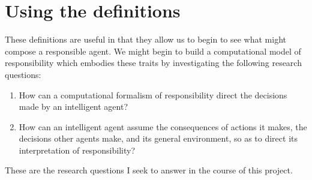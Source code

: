 \section{Using the definitions}
These definitions are useful in that they allow us to begin to see what might compose a responsible agent. We might begin to build a computational model of responsibility which embodies these traits by investigating the following research questions:
\begin{enumerate}
    \item How can a computational formalism of responsibility direct the decisions made by an intelligent agent?
    \item How can an intelligent agent assume the consequences of actions it makes, the decisions other agents make, and its general environment, so as to direct its interpretation of responsibility?
\end{enumerate}\par

These are the research questions I seek to answer in the course of this project.
